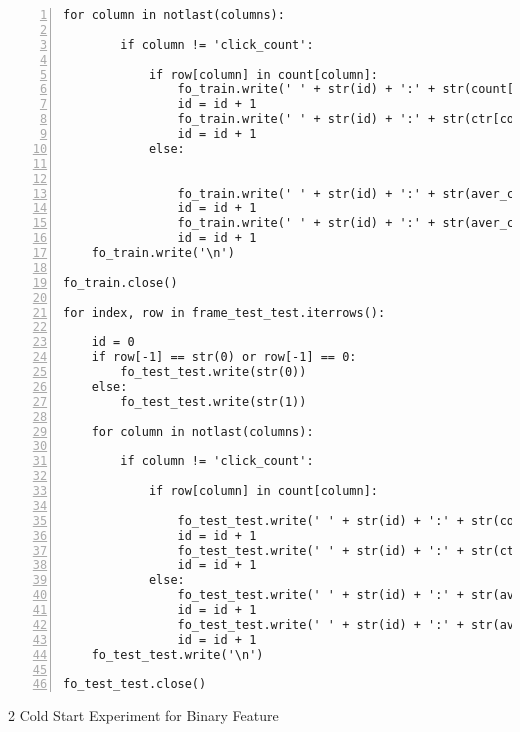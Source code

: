 \begin{lstlisting}[numbers=left, breaklines=true]
    for column in notlast(columns):

        if column != 'click_count':

            if row[column] in count[column]:
                fo_train.write(' ' + str(id) + ':' + str(count[column][row[column]]))
                id = id + 1
                fo_train.write(' ' + str(id) + ':' + str(ctr[column][row[column]]))
                id = id + 1
            else:


                fo_train.write(' ' + str(id) + ':' + str(aver_count[column]))
                id = id + 1
                fo_train.write(' ' + str(id) + ':' + str(aver_ctr[column]))
                id = id + 1
    fo_train.write('\n')

fo_train.close()

for index, row in frame_test_test.iterrows():

    id = 0
    if row[-1] == str(0) or row[-1] == 0:
        fo_test_test.write(str(0))
    else:
        fo_test_test.write(str(1))

    for column in notlast(columns):

        if column != 'click_count':

            if row[column] in count[column]:

                fo_test_test.write(' ' + str(id) + ':' + str(count[column][row[column]]))
                id = id + 1
                fo_test_test.write(' ' + str(id) + ':' + str(ctr[column][row[column]]))
                id = id + 1
            else:
                fo_test_test.write(' ' + str(id) + ':' + str(aver_count[column]))
                id = id + 1
                fo_test_test.write(' ' + str(id) + ':' + str(aver_ctr[column]))
                id = id + 1
    fo_test_test.write('\n')

fo_test_test.close() 
\end{lstlisting}
2 Cold Start Experiment for Binary Feature
